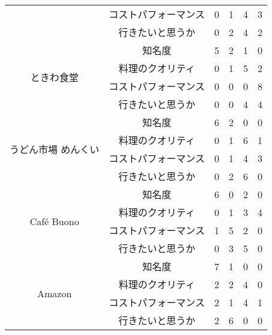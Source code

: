 \begin{table}[H]
\begin{tabular}{|c|c|r|r|r|r|}
 & コストパフォーマンス & 0 & 1 & 4 & 3 \\ \cline{2-6}
 & 行きたいと思うか & 0 & 2 & 4 & 2 \\ \hline
\multirow{4}{*}{ときわ食堂} & 知名度 & 5 & 2 & 1 & 0 \\ \cline{2-6}
 & 料理のクオリティ & 0 & 1 & 5 & 2 \\ \cline{2-6}
 & コストパフォーマンス & 0 & 0 & 0 & 8 \\ \cline{2-6}
 & 行きたいと思うか & 0 & 0 & 4 & 4 \\ \hline
\multirow{4}{*}{うどん市場 めんくい} & 知名度 & 6 & 2 & 0 & 0 \\ \cline{2-6}
 & 料理のクオリティ & 0 & 1 & 6 & 1 \\ \cline{2-6}
 & コストパフォーマンス & 0 & 1 & 4 & 3 \\ \cline{2-6}
 & 行きたいと思うか & 0 & 2 & 6 & 0 \\ \hline
\multirow{4}{*}{Café Buono} & 知名度 & 6 & 0 & 2 & 0 \\ \cline{2-6}
 & 料理のクオリティ & 0 & 1 & 3 & 4 \\ \cline{2-6}
 & コストパフォーマンス & 1 & 5 & 2 & 0 \\ \cline{2-6}
 & 行きたいと思うか & 0 & 3 & 5 & 0 \\ \hline
\multirow{4}{*}{Amazon} & 知名度 & 7 & 1 & 0 & 0 \\ \cline{2-6}
 & 料理のクオリティ & 2 & 2 & 4 & 0 \\ \cline{2-6}
 & コストパフォーマンス & 2 & 1 & 4 & 1 \\ \cline{2-6}
 & 行きたいと思うか & 2 & 6 & 0 & 0 \\ \hline
\end{tabular}
\end{table}
